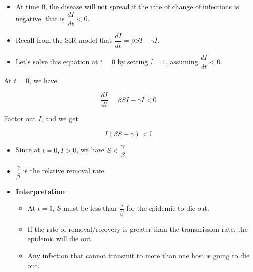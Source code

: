 \documentclass[
  ignorenonframetext,
]{beamer}
\providecommand{\tightlist}{%
  \setlength{\itemsep}{0pt}\setlength{\parskip}{0pt}}\usepackage{longtable,booktabs,array}
\begin{document}
\begin{frame}
\begin{itemize}
\item
  At time 0, the disease will not spread if the rate of change of
  infections is negative, that is {\(\dfrac{dI}{dt} < 0\)}.
\item
  Recall from the SIR model that
  {\(\dfrac{dI}{dt} = \beta S I - \gamma I\)}.
\item
  Let's solve this equation at \(t = 0\) by setting \(I = 1\), assuming
  {\(\dfrac{dI}{dt} < 0\)}.
\end{itemize}
\end{frame}

\begin{frame}
At \(t = 0\), we have

\begin{equation*}
\frac{dI}{dt} = \beta S I - \gamma I < 0 \end{equation*}

Factor out \(I\), and we get

\begin{equation*}
I (\beta S - \gamma) < 0
\end{equation*}
\end{frame}

\begin{frame}
\begin{itemize}
\item
  Since at \(t=0\)\(, I > 0\), we have {\(S < \dfrac{\gamma}{\beta}\)}.
\item
  {\(\dfrac{\gamma}{\beta}\)} is the relative removal rate.
\end{itemize}
\end{frame}

\begin{frame}
\begin{itemize}
\item
  \textbf{Interpretation}:

  \begin{itemize}
  \tightlist
  \item
    At \(t = 0\), \(S\) must be less than \(\dfrac{\gamma}{\beta}\) for
    the epidemic to die out.
  \item
    If the rate of removal/recovery is greater than the transmission
    rate, the epidemic will die out.
  \item
    Any infection that cannot transmit to more than one host is going to
    die out.
  \end{itemize}
\end{itemize}
\end{frame}
\end{document}
